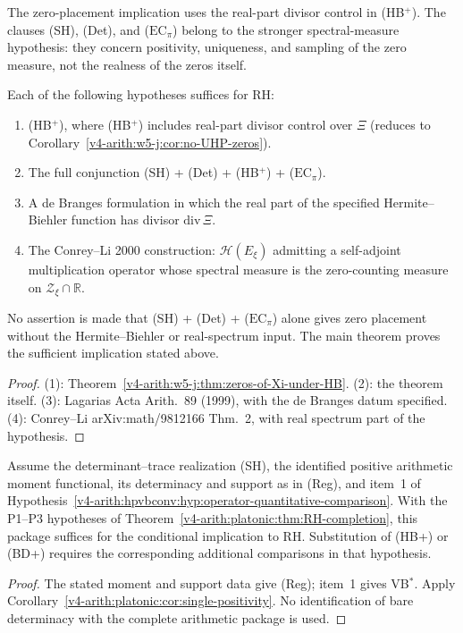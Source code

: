 \begin{remark}
\label{v4-arith:w5-j:rem:proof-order}
The zero-placement implication uses the real-part divisor control in
(HB\(^{+}\)).  The clauses (SH), (Det),
and (\(\mathrm{EC}_\pi\)) belong to the stronger spectral-measure hypothesis:
they concern positivity, uniqueness, and sampling of the zero
measure, not the realness of the zeros itself.
\end{remark}

\begin{corollary}
\label{v4-arith:w5-j:cor:equivalent-forms}
Each of the following hypotheses suffices for RH:
\begin{enumerate}
\item (HB\(^{+}\)), where (HB\(^{+}\)) includes real-part divisor
control over \(\Xi\) (reduces to
Corollary~\ref{v4-arith:w5-j:cor:no-UHP-zeros}).
\item The full conjunction (SH) + (Det) + (HB\(^{+}\)) + (\(\mathrm{EC}_\pi\)).
\item A de Branges formulation in which the real part of the specified
Hermite--Biehler function has divisor \(\mathrm{div}\,\Xi\).
\item The Conrey--Li 2000 construction: \(\mathcal{H}(E_{\xi})\)
admitting a self-adjoint multiplication operator whose spectral
measure is the zero-counting measure on
\(\mathcal{Z}_{\xi}\cap\mathbb{R}\).
\end{enumerate}
No assertion is made that (SH) + (Det) + (\(\mathrm{EC}_\pi\)) alone gives
zero placement without the Hermite--Biehler or real-spectrum input. The
main theorem proves the sufficient implication stated above.
\end{corollary}

\begin{proof}
(1): Theorem~\ref{v4-arith:w5-j:thm:zeros-of-Xi-under-HB}. (2): the theorem
itself. (3): Lagarias Acta Arith.~89 (1999), with the de Branges
datum specified. (4): Conrey--Li
arXiv:math/9812166 Thm.~2, with real spectrum part of the hypothesis.
\end{proof}

\begin{theorem}
\label{v4-arith:w5-j:thm:main-direction-as-component}
Assume the determinant--trace realization (SH), the identified
positive arithmetic moment functional, its determinacy and support
as in (Reg), and item~1 of
Hypothesis~\ref{v4-arith:hpvbconv:hyp:operator-quantitative-comparison}.
With the P1--P3 hypotheses of
Theorem~\ref{v4-arith:platonic:thm:RH-completion}, this package
suffices for the conditional implication to RH. Substitution of
(HB+) or (BD+) requires the corresponding additional comparisons
in that hypothesis.
\end{theorem}
\begin{proof}
The stated moment and support data give (Reg); item~1 gives
VB\(^{*}\). Apply
Corollary~\ref{v4-arith:platonic:cor:single-positivity}.
No identification of bare determinacy with the complete arithmetic
package is used.
\end{proof}

